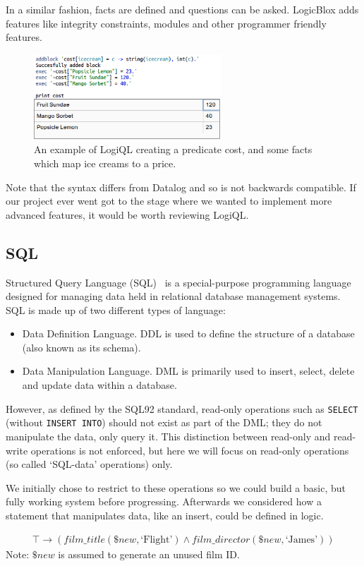 \documentclass[a4paper, 11pt]{article}
\begin{document}
  In a similar fashion, facts are defined and questions can be asked. LogicBlox adds features like integrity constraints, modules and other programmer friendly features.

  \begin{figure}[h!]
    \centering
    \includegraphics[width=7cm]{images/logicblox.png}
    \caption{An example of LogiQL creating a predicate cost, and some facts which map ice creams to a price.}
  \end{figure}

  Note that the syntax differs from Datalog and so is not backwards compatible. If our project ever went got to the stage where we wanted to implement more advanced features, it would be worth reviewing LogiQL.
  
  \subsection{SQL}
    Structured Query Language (SQL)~\cite{wiki:SQL} is a special-purpose
    programming language designed for managing data held in relational database
    management systems. SQL is made up of two different types of language:

    \begin{itemize}
      \item
        Data Definition Language. DDL is used to define the structure of a
        database (also known as its schema).
      \item
        Data Manipulation Language. DML is primarily used to insert, select,
        delete and update data within a database.
    \end{itemize}

    However, as defined by the SQL92 standard\cite{isoSQL}, read-only operations
    such as \texttt{SELECT} (without \texttt{INSERT INTO}) should not exist as
    part of the DML; they do not manipulate the data, only query it. This
    distinction between read-only and read-write operations is not enforced, but
    here we will focus on read-only operations (so called `SQL-data' operations)
    only.

    We initially chose to restrict to these operations so we could build a basic,
    but fully working system before progressing. Afterwards we considered how
    a statement that manipulates data, like an insert, could be defined in logic.
    \begin{center}
      \begin{gather}
        \top \rightarrow (film\_title(\$new, \text{`Flight'}) \land
          film\_director(\$new, \text{`James'}))
      \end{gather}
      Note: $\$new$ is assumed to generate an unused film ID.
    \end{center}
\end{document}
